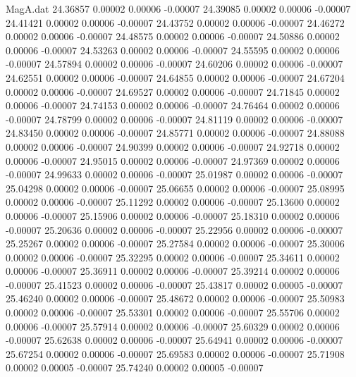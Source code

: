 \begin{filecontents}{MagA.dat}
  24.36857    0.00002    0.00006   -0.00007
  24.39085    0.00002    0.00006   -0.00007
  24.41421    0.00002    0.00006   -0.00007
  24.43752    0.00002    0.00006   -0.00007
  24.46272    0.00002    0.00006   -0.00007
  24.48575    0.00002    0.00006   -0.00007
  24.50886    0.00002    0.00006   -0.00007
  24.53263    0.00002    0.00006   -0.00007
  24.55595    0.00002    0.00006   -0.00007
  24.57894    0.00002    0.00006   -0.00007
  24.60206    0.00002    0.00006   -0.00007
  24.62551    0.00002    0.00006   -0.00007
  24.64855    0.00002    0.00006   -0.00007
  24.67204    0.00002    0.00006   -0.00007
  24.69527    0.00002    0.00006   -0.00007
  24.71845    0.00002    0.00006   -0.00007
  24.74153    0.00002    0.00006   -0.00007
  24.76464    0.00002    0.00006   -0.00007
  24.78799    0.00002    0.00006   -0.00007
  24.81119    0.00002    0.00006   -0.00007
  24.83450    0.00002    0.00006   -0.00007
  24.85771    0.00002    0.00006   -0.00007
  24.88088    0.00002    0.00006   -0.00007
  24.90399    0.00002    0.00006   -0.00007
  24.92718    0.00002    0.00006   -0.00007
  24.95015    0.00002    0.00006   -0.00007
  24.97369    0.00002    0.00006   -0.00007
  24.99633    0.00002    0.00006   -0.00007
  25.01987    0.00002    0.00006   -0.00007
  25.04298    0.00002    0.00006   -0.00007
  25.06655    0.00002    0.00006   -0.00007
  25.08995    0.00002    0.00006   -0.00007
  25.11292    0.00002    0.00006   -0.00007
  25.13600    0.00002    0.00006   -0.00007
  25.15906    0.00002    0.00006   -0.00007
  25.18310    0.00002    0.00006   -0.00007
  25.20636    0.00002    0.00006   -0.00007
  25.22956    0.00002    0.00006   -0.00007
  25.25267    0.00002    0.00006   -0.00007
  25.27584    0.00002    0.00006   -0.00007
  25.30006    0.00002    0.00006   -0.00007
  25.32295    0.00002    0.00006   -0.00007
  25.34611    0.00002    0.00006   -0.00007
  25.36911    0.00002    0.00006   -0.00007
  25.39214    0.00002    0.00006   -0.00007
  25.41523    0.00002    0.00006   -0.00007
  25.43817    0.00002    0.00005   -0.00007
  25.46240    0.00002    0.00006   -0.00007
  25.48672    0.00002    0.00006   -0.00007
  25.50983    0.00002    0.00006   -0.00007
  25.53301    0.00002    0.00006   -0.00007
  25.55706    0.00002    0.00006   -0.00007
  25.57914    0.00002    0.00006   -0.00007
  25.60329    0.00002    0.00006   -0.00007
  25.62638    0.00002    0.00006   -0.00007
  25.64941    0.00002    0.00006   -0.00007
  25.67254    0.00002    0.00006   -0.00007
  25.69583    0.00002    0.00006   -0.00007
  25.71908    0.00002    0.00005   -0.00007
  25.74240    0.00002    0.00005   -0.00007

\end{filecontents}
